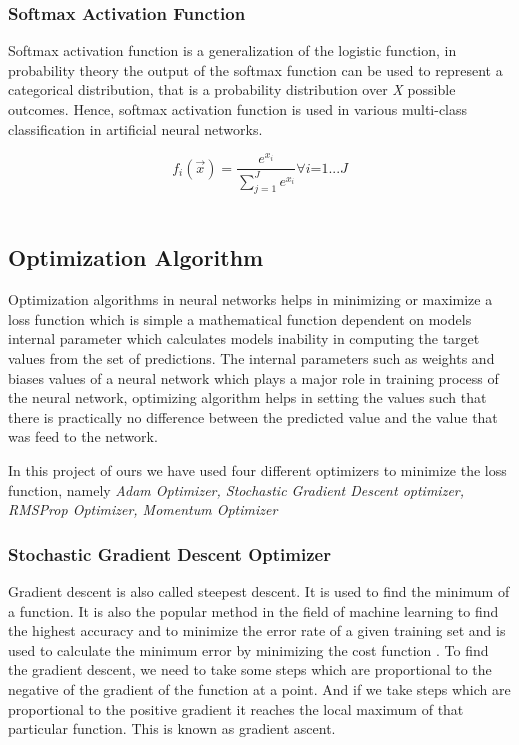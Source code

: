 \documentclass[12pt, a4paper]{report}
\begin{document}
\subsubsection{Softmax Activation Function}\label{sec:softmax}
Softmax activation function is a generalization of the logistic function, in probability theory the output of the softmax function can be used to represent a categorical distribution, that is a probability distribution over \textit{X} possible outcomes. Hence, softmax activation function is used in various multi-class classification in artificial neural networks.\\ \par
\begin{equation}\label{eq:softmax}
f_{i} (\overrightarrow{x}) =\frac{e^{x_{i}}}{\sum_{j=1}^{J} e^{x_{i}} }     \forall \textit{i=1...J}
\end{equation}
\\ \par

\subsection{Optimization Algorithm}\label{optimizer}

Optimization algorithms in neural networks helps in minimizing or maximize a loss function which is simple a mathematical function dependent on models internal parameter which calculates models inability in computing the target values from the set of predictions. The internal parameters such as weights and biases values of a neural network which plays a major role in training process of the neural network, optimizing algorithm helps in setting the values such that there is practically no difference between the predicted value and the value that was feed to the network.\\ \par

In this project of ours we have used four different optimizers to minimize the loss function, namely \textit{Adam Optimizer, Stochastic Gradient Descent optimizer, RMSProp Optimizer, Momentum Optimizer}

\subsubsection{Stochastic Gradient Descent Optimizer}\label{sgd}
Gradient descent is also called steepest descent. It is used to find the minimum of a function. It is also the popular method in the field of machine learning to find the highest accuracy and to minimize the error rate of a given training set and is used to calculate the minimum error by minimizing the cost function . To find the gradient descent, we need to take some steps which are proportional to the negative of the gradient of the function at a point. And if we take steps which are proportional to the positive gradient it reaches the local maximum of that particular function. This is known as gradient ascent\cite{OptimizerGeneral}.\\ \par
\end{document}
